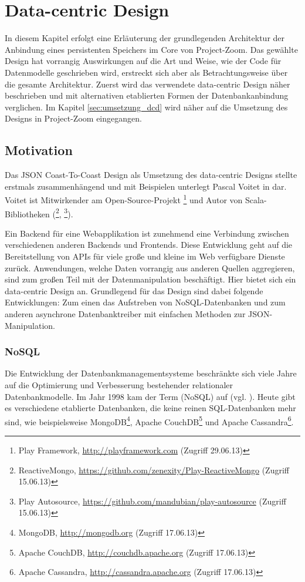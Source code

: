 
\section{Data-centric Design}
\label{sec:dcd}
In diesem Kapitel erfolgt eine Erläuterung der grundlegenden Architektur der Anbindung eines persistenten Speichers im Core von Project-Zoom. Das gewählte Design hat vorrangig Auswirkungen auf die Art und Weise, wie der Code für Datenmodelle geschrieben wird, erstreckt sich aber als Betrachtungsweise über die gesamte Architektur. Zuerst wird das verwendete data-centric Design näher beschrieben und mit alternativen etablierten Formen der Datenbankanbindung verglichen. Im Kapitel \ref{sec:umsetzung_dcd} wird näher auf die Umsetzung des Designs in Project-Zoom eingegangen.

\subsection{Motivation}
\label{sec:dcdmotivation}
Das JSON Coast-To-Coast Design als Umsetzung des data-centric Designs stellte erstmals zusammenhängend und mit Beispielen unterlegt Pascal Voitet in \cite{jctc} dar. Voitet ist Mitwirkender am Open-Source-Projekt \footnote{Play \gls{Framework}, \url{http://playframework.com} (Zugriff 29.06.13)} und Autor von Scala-Bibliotheken (\footnote{ReactiveMongo, \url{ https://github.com/zenexity/Play-ReactiveMongo} (Zugriff 15.06.13)}, \footnote{Play Autosource, \url{ https://github.com/mandubian/play-autosource} (Zugriff 15.06.13)}). 

Ein \gls{Backend} für eine Webapplikation ist zunehmend eine Verbindung zwischen verschiedenen anderen \gls{Backend}s und \gls{Frontend}s. Diese Entwicklung geht auf die Bereitstellung von APIs für viele große und kleine im Web verfügbare Dienste zurück. Anwendungen, welche Daten vorrangig aus anderen Quellen aggregieren, sind zum großen Teil mit der Datenmanipulation beschäftigt. Hier bietet sich ein data-centric Design an. Grundlegend für das Design sind dabei folgende Entwicklungen: Zum einen das Aufstreben von NoSQL-Datenbanken und zum anderen asynchrone Datenbanktreiber mit einfachen Methoden zur JSON-Manipulation.

\subsubsection{NoSQL}
Die Entwicklung der Datenbankmanagementsysteme beschränkte sich viele Jahre auf die Optimierung und Verbesserung bestehender relationaler Datenbankmodelle. Im Jahr 1998 kam der Term  (NoSQL) auf (vgl. \cite{storage-solutions}). Heute gibt es verschiedene etablierte Datenbanken, die keine reinen SQL-Datenbanken mehr sind, wie beispielsweise MongoDB\footnote{MongoDB, \url{http://mongodb.org} (Zugriff 17.06.13)}, Apache CouchDB\footnote{Apache CouchDB, \url{http://couchdb.apache.org} (Zugriff 17.06.13)} und Apache Cassandra\footnote{Apache Cassandra, \url{http://cassandra.apache.org} (Zugriff 17.06.13)}.

